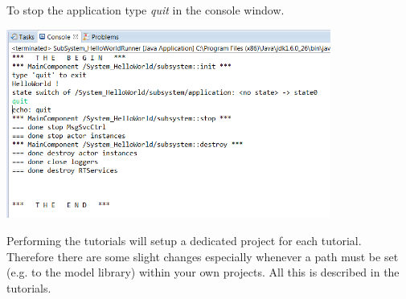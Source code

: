 To stop the application type \textit{quit} in the console window.
 
\includegraphics[width=0.8\textwidth]{images/013-SetupWorkspace07.png} 

Performing the tutorials will setup a dedicated project for each tutorial. Therefore there are some 
slight changes especially whenever a path must be set (e.g. to the model library) within your own 
projects. All this is described in the tutorials.
